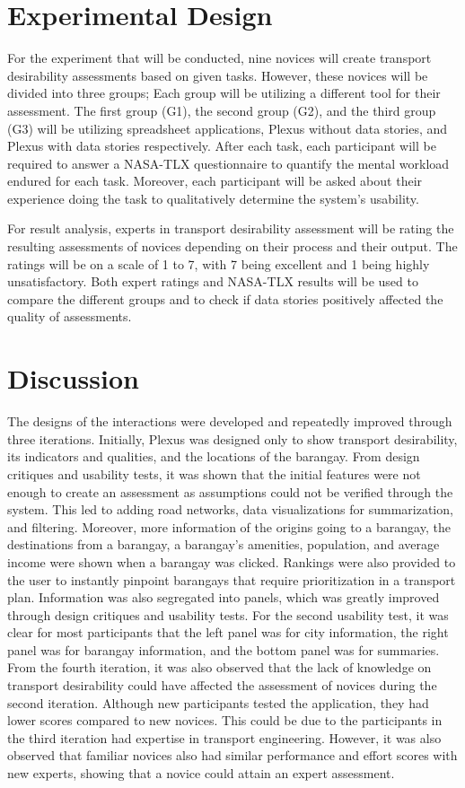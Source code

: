 \documentclass{sigchi}
\begin{document}
\section{Experimental Design}
For the experiment that will be conducted, nine novices will create transport desirability assessments based on given tasks. However, these novices will be divided into three groups; Each group will be utilizing a different tool for their assessment. The first group (G1), the second group (G2), and the third group (G3) will be utilizing spreadsheet applications, Plexus without data stories, and Plexus with data stories respectively. After each task, each participant will be required to answer a NASA-TLX questionnaire to quantify the mental workload endured for each task. Moreover, each participant will be asked about their experience doing the task to qualitatively determine the system’s usability.  

For result analysis, experts in transport desirability assessment will be rating the resulting assessments of novices depending on their process and their output. The ratings will be on a scale of 1 to 7, with 7 being excellent and 1 being highly unsatisfactory. Both expert ratings and NASA-TLX results will be used to compare the different groups and to check if data stories positively affected the quality of assessments.  

\section{Discussion}
The designs of the interactions were developed and repeatedly improved through three iterations. Initially, Plexus was designed only to show transport desirability, its indicators and qualities, and the locations of the barangay. From design critiques and usability tests, it was shown that the initial features were not enough to create an assessment as assumptions could not be verified through the system. This led to adding road networks, data visualizations for summarization, and filtering. Moreover, more information of the origins going to a barangay, the destinations from a barangay, a barangay’s amenities, population, and average income were shown when a barangay was clicked. Rankings were also provided to the user to instantly pinpoint barangays that require prioritization in a transport plan. Information was also segregated into panels, which was greatly improved through design critiques and usability tests. For the second usability test, it was clear for most participants that the left panel was for city information, the right panel was for barangay information, and the bottom panel was for summaries. From the fourth iteration, it was also observed that the lack of knowledge on transport desirability could have affected the assessment of novices during the second iteration. Although new participants tested the application, they had lower scores compared to new novices. This could be due to the participants in the third iteration had expertise in transport engineering. However, it was also observed that familiar novices also had similar performance and effort scores with new experts, showing that a novice could attain an expert assessment.
\end{document}
